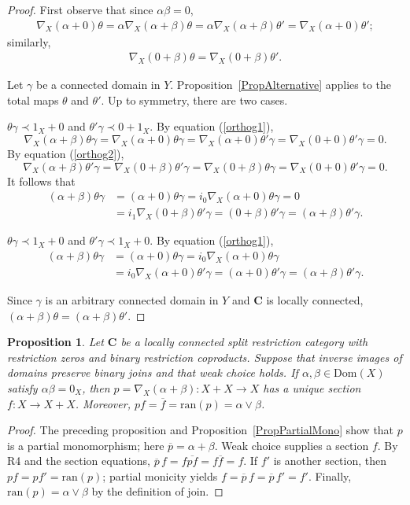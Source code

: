 \documentclass[letterpaper,10pt]{amsart}
\theoremstyle{plain}
\newtheorem{prop}{Proposition}[thm]
\theoremstyle{definition}
\newcommand{\rst}[1]{\overline{#1}}
\begin{document}
\begin{proof}
First observe that since $\alpha\beta=0$,
\begin{align}\label{orthog1}
\nabla_X(\alpha+0)\theta=\alpha\nabla_X(\alpha+\beta)\theta=\alpha\nabla_X(\alpha+\beta)\theta'
=\nabla_X(\alpha+0)\theta';
\end{align}
similarly,
\begin{align}\label{orthog2}
\nabla_X(0+\beta)\theta=\nabla_X(0+\beta)\theta'.
\end{align}

Let $\gamma$ be a connected domain in $Y$. Proposition~\ref{PropAlternative}
applies to the total maps $\theta$ and $\theta'$. Up to symmetry,
there are two cases.

 $\theta\gamma\prec1_X+0$ and $\theta'\gamma\prec0+1_X$.
By equation (\ref{orthog1}),
\[
\nabla_X(\alpha+\beta)\theta\gamma=\nabla_X(\alpha+0)\theta\gamma
=\nabla_X(\alpha+0)\theta'\gamma=\nabla_X(0+0)\theta'\gamma=0.
\]
By equation (\ref{orthog2}),
\[
\nabla_X(\alpha+\beta)\theta'\gamma=\nabla_X(0+\beta)\theta'\gamma
=\nabla_X(0+\beta)\theta\gamma=\nabla_X(0+0)\theta'\gamma=0.
\]
It follows that
\begin{align*}
(\alpha+\beta)\theta\gamma&=(\alpha+0)\theta\gamma=i_0\nabla_X(\alpha+0)\theta\gamma=0\\
&=i_1\nabla_X(0+\beta)\theta'\gamma=(0+\beta)\theta'\gamma=(\alpha+\beta)\theta'\gamma.
\end{align*}

 $\theta\gamma\prec1_X+0$ and $\theta'\gamma\prec1_X+0$. By equation (\ref{orthog1}),
\begin{align*}
(\alpha+\beta)\theta\gamma&=(\alpha+0)\theta\gamma=i_0\nabla_X(\alpha+0)\theta\gamma\\
&=i_0\nabla_X(\alpha+0)\theta'\gamma=(\alpha+0)\theta'\gamma=(\alpha+\beta)\theta'\gamma.
\end{align*}

Since $\gamma$ is an arbitrary connected domain in $Y$ and $\mathbf{C}$ is locally connected,  $(\alpha+\beta)\theta=(\alpha+\beta)\theta'$.
\end{proof}

\begin{prop}\label{PropCopOut}
Let $\mathbf C$ be a locally connected split restriction category with
restriction zeros and binary restriction coproducts. Suppose that inverse
images of domains preserve binary joins and that weak choice holds.
If $\alpha,\beta\in\mathrm{Dom}(X)$ satisfy $\alpha\beta=0_X$,
then $p=\nabla_X(\alpha+\beta):X+X\to X$ has a unique section
$f:X\to X+X$. Moreover, $pf=\rst f=\mathrm{ran}(p)=\alpha\vee\beta$.
\end{prop}
\begin{proof}
The preceding proposition and Proposition~\ref{PropPartialMono} show
that $p$ is a partial monomorphism; here $\rst p=\alpha+\beta$.
Weak choice supplies a section $f$. By R4 and the section equations,
$\rst p\,f=f\rst{pf}=f\rst f=f$.
If $f'$ is another section, then $pf=pf'=\mathrm{ran}(p)$;
partial monicity yields $f=\rst p\,f=\rst p\,f'=f'$.
Finally, $\mathrm{ran}(p)=\alpha\vee\beta$ by the definition of join.
\end{proof}
\end{document}
